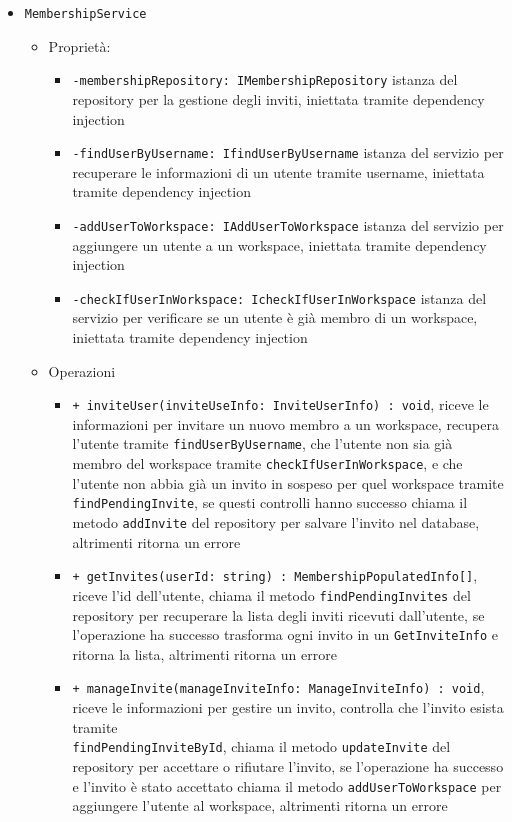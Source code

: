 \documentclass[a4paper, 11pt]{article}
\begin{document}
\begin{itemize}
\begin{itemize}
			\item \texttt{MembershipService}
				\begin{itemize}
					\item Proprietà:
						\begin{itemize}
							\item \texttt{-membershipRepository: IMembershipRepository} istanza del repository per la gestione degli inviti, iniettata tramite dependency injection
							\item \texttt{-findUserByUsername: IfindUserByUsername} istanza del servizio per recuperare le informazioni di un utente tramite username, iniettata tramite dependency injection
							\item \texttt{-addUserToWorkspace: IAddUserToWorkspace} istanza del servizio per aggiungere un utente a un workspace, iniettata tramite dependency injection
							\item \texttt{-checkIfUserInWorkspace: IcheckIfUserInWorkspace} istanza del servizio per verificare se un utente è già membro di un workspace, iniettata tramite dependency injection
						\end{itemize}
					\item Operazioni
						\begin{itemize}
							\item \texttt{+ inviteUser(inviteUseInfo: InviteUserInfo) : void}, riceve le informazioni per invitare un nuovo membro a un workspace, recupera l'utente tramite \texttt{findUserByUsername}, che l'utente non sia già membro del workspace tramite \texttt{checkIfUserInWorkspace}, e che l'utente non abbia già un invito in sospeso per quel workspace tramite \texttt{findPendingInvite}, se questi controlli hanno successo chiama il metodo \texttt{addInvite} del repository per salvare l'invito nel database, altrimenti ritorna un errore
							\item \texttt{+ getInvites(userId: string) : MembershipPopulatedInfo[]}, riceve l'id dell'utente, chiama il metodo \texttt{findPendingInvites} del repository per recuperare la lista degli inviti ricevuti dall'utente, se l'operazione ha successo trasforma ogni invito in un \texttt{GetInviteInfo} e ritorna la lista, altrimenti ritorna un errore
							\item \texttt{+ manageInvite(manageInviteInfo: ManageInviteInfo) : void}, riceve le informazioni per gestire un invito, controlla che l'invito esista tramite \\ \texttt{findPendingInviteById}, chiama il metodo \texttt{updateInvite} del repository per accettare o rifiutare l'invito, se l'operazione ha successo e l'invito è stato accettato chiama il metodo \texttt{addUserToWorkspace} per aggiungere l'utente al workspace, altrimenti ritorna un errore
						\end{itemize}
				\end{itemize}


\end{itemize}
\end{itemize}
\end{document}
